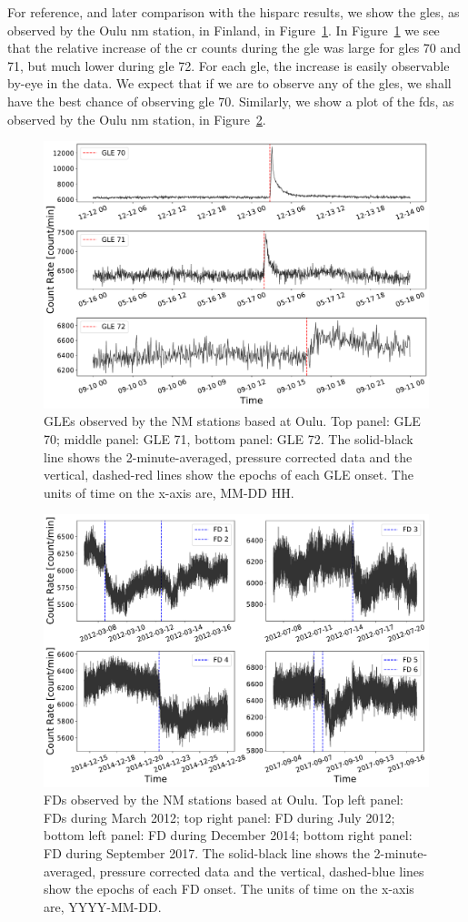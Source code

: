 For reference, and later comparison with the \gls{hisparc} results, we show the \glspl{gle}, as observed by the Oulu \gls{nm} station, in Finland, in Figure~\ref{fig:oulu_gles}. In Figure~\ref{fig:oulu_gles} we see that the relative increase of the \gls{cr} counts during the \gls{gle} was large for \glspl{gle} 70 and 71, but much lower during \gls{gle} 72. For each \gls{gle}, the increase is easily observable by-eye in the data. We expect that if we are to observe any of the \glspl{gle}, we shall have the best chance of observing \gls{gle} 70. Similarly, we show a plot of the \glspl{fd}, as observed by the Oulu \gls{nm} station, in Figure~\ref{fig:oulu_fds}. 

\begin{figure}[ht!]
	\centering
	\includegraphics[width=0.75\columnwidth]{GLEs_OULU.pdf}
	\caption{GLEs observed by the NM stations based at Oulu. Top panel: GLE 70; middle panel: GLE 71, bottom panel: GLE 72. The solid-black line shows the 2-minute-averaged, pressure corrected data and the vertical, dashed-red lines show the epochs of each GLE onset. The units of time on the x-axis are, MM-DD HH.}
	\label{fig:oulu_gles}
\end{figure}
%
\begin{figure}[ht!]
	\centering
	\includegraphics[width=0.75\columnwidth]{FDs_OULU.pdf}
	\caption{FDs observed by the NM stations based at Oulu. Top left panel: FDs during March 2012; top right panel: FD during July 2012; bottom left panel: FD during December 2014; bottom right panel: FD during September 2017. The solid-black line shows the 2-minute-averaged, pressure corrected data and the vertical, dashed-blue lines show the epochs of each FD onset. The units of time on the x-axis are, YYYY-MM-DD.}
	\label{fig:oulu_fds}
\end{figure}

